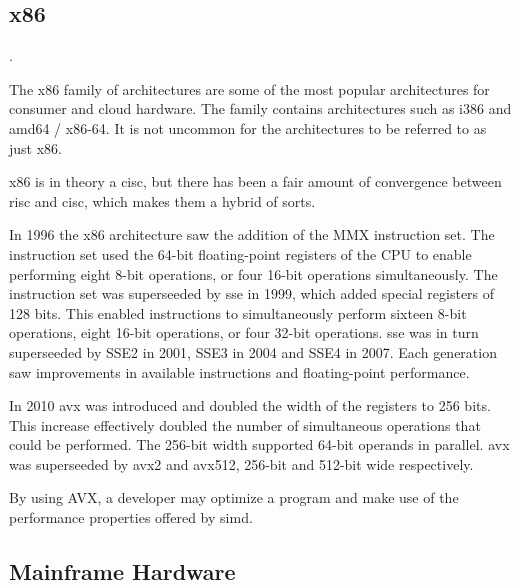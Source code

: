 \subsection{x86}

.


The \gls{x86} family of architectures are some of the most popular architectures for consumer and cloud hardware. The family contains architectures such as i386 and amd64 / x86-64. It is not uncommon for the architectures to be referred to as just \gls{x86}\cite{carter2002}.

\gls{x86} is in theory a \gls{cisc}, but there has been a fair amount of convergence between \gls{risc} and \gls{cisc}, which makes them a hybrid of sorts\cite{carter2002}.

In 1996 the x86 architecture saw the addition of the MMX instruction set. The instruction set used the 64-bit floating-point registers of the CPU to enable performing eight 8-bit operations, or four 16-bit operations simultaneously. The instruction set was superseeded by \gls{sse} in 1999, which added special registers of 128 bits. This enabled instructions to simultaneously perform sixteen 8-bit operations, eight 16-bit operations, or four 32-bit operations. \gls{sse} was in turn superseeded by SSE2 in 2001, SSE3 in 2004 and SSE4 in 2007. Each generation saw improvements in available instructions and floating-point performance\cite{hennessy2011:avx}.

In 2010 \gls{avx} was introduced and doubled the width of the registers to 256 bits. This increase effectively doubled the number of simultaneous operations that could be performed. The 256-bit width supported 64-bit operands in parallel\cite{hennessy2011:avx}. \gls{avx} was superseeded by \gls{avx2} and \gls{avx512}, 256-bit\cite{intel:avx2} and 512-bit\cite{intel:avx512} wide respectively.


By using AVX, a developer may optimize a program and make use of the performance properties offered by \gls{simd}\cite{hennessy2011:avx}.

\subsection{Mainframe Hardware}

